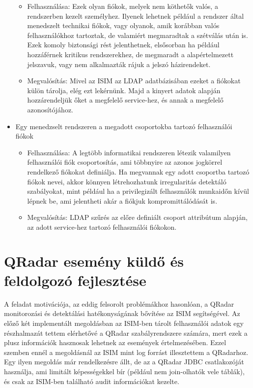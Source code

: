 \begin{itemize}
	\begin{itemize}
		\small
		\item Felhasználása: Ezek olyan fiókok, melyek nem köthetők valós, a rendszerben kezelt személyhez. Ilyenek lehetnek például a rendszer által menedszelt technikai fiókok, vagy olyanok, amik korábban valós felhasználókhoz tartoztak, de valamiért megmaradtak a szétválás után is. Ezek komoly biztonsági rést jelenthetnek, elsősorban ha például hozzáférnek kritikus rendszerekhez, de megmaradt a alapértelmezett jelszavuk, vagy nem alkalmazták rájuk a jelszó házirendeket.
		\item Megvalósítás: Mivel az ISIM az LDAP adatbázisában ezeket a fiókokat külön tárolja, elég ezt lekérnünk. Majd a kinyert adatok alapján hozzárendeljük őket a megfelelő service-hez, és annak a megfelelő azonosítójához.
	\end{itemize}
	\item Egy menedzselt rendszeren a megadott csoportokba tartozó felhasználói fiókok
	\begin{itemize}
		\small
		\item Felhasználása: A legtöbb informatikai rendszeren létezik valamilyen felhasználói fiók csoportosítás, ami többnyire az azonos jogkörrel rendelkező fiókokat definiálja. Ha megvannak egy adott csoportba tartozó fiókok nevei, akkor könnyen létrehozhatunk irregularitás detektáló szabályokat, mint például ha a privilegizált felhasználók munkaidőn kívül lépnek be, ami jelentheti akár a fiókjuk kompromittálódását is.
		\item Megvalósítás: LDAP szűrés az előre definiált csoport attribútum alapján, az adott service-hez tartozó felhasználói fiókokon.
	\end{itemize}
	
\end{itemize}
\section{QRadar esemény küldő és feldolgozó fejlesztése}
A feladat motivációja, az eddig felsorolt problémákhoz hasonlóan, a QRadar monitorozási és detektálási hatékonyságának bővítése az ISIM segítségével. Az előző két implementált megoldásban az ISIM-ben tárolt felhasználói adatok egy részhalmazát tettem elérhetővé a QRadar szabályrendszere számára, mert ezek a plusz információk hasznosak lehetnek az események értelmezésében. Ezzel szemben ennél a megoldásnál az ISIM mint log forrást illesztettem a QRadarhoz. Egy ilyen megoldás már rendelkezésre állt, de az a QRadar JDBC csatlakozóját használja, ami limitált képességekkel bír (például nem join-olhatók vele táblák), és csak az ISIM-ben található audit információkat kezelte.

